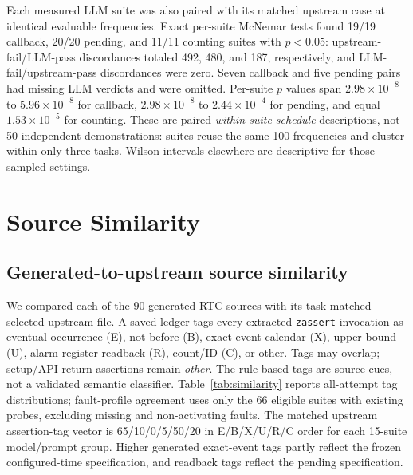 Each measured LLM suite was also paired with its matched upstream case at identical evaluable frequencies. Exact per-suite McNemar tests found 19/19 callback, 20/20 pending, and 11/11 counting suites with $p<0.05$: upstream-fail/LLM-pass discordances totaled 492, 480, and 187, respectively, and LLM-fail/upstream-pass discordances were zero. Seven callback and five pending pairs had missing LLM verdicts and were omitted. Per-suite $p$ values span $2.98\times10^{-8}$ to $5.96\times10^{-8}$ for callback, $2.98\times10^{-8}$ to $2.44\times10^{-4}$ for pending, and equal $1.53\times10^{-5}$ for counting. These are paired \emph{within-suite schedule} descriptions, not 50 independent demonstrations: suites reuse the same 100 frequencies and cluster within only three tasks. Wilson intervals elsewhere are descriptive for those sampled settings.


\section{Source Similarity}\label{app:similarity}
\subsection{Generated-to-upstream source similarity}
We compared each of the 90 generated RTC sources with its task-matched selected upstream file. A saved ledger tags every extracted \texttt{zassert} invocation as eventual occurrence (E), not-before (B), exact event calendar (X), upper bound (U), alarm-register readback (R), count/ID (C), or other. Tags may overlap; setup/API-return assertions remain \emph{other}. The rule-based tags are source cues, not a validated semantic classifier. Table~\ref{tab:similarity} reports all-attempt tag distributions; fault-profile agreement uses only the 66 eligible suites with existing probes, excluding missing and non-activating faults. The matched upstream assertion-tag vector is 65/10/0/5/50/20 in E/B/X/U/R/C order for each 15-suite model/prompt group. Higher generated exact-event tags partly reflect the frozen configured-time specification, and readback tags reflect the pending specification.

